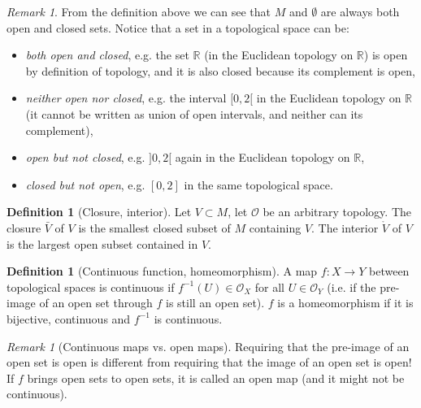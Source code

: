 \documentclass[a4paper,11pt,titlepage, article, oneside]{memoir}
\numberwithin{equation}{section}
\theoremstyle{definition}
\newtheorem{definition}[theorem]{Definition}
\theoremstyle{remark}
\newtheorem{remark}[theorem]{Remark}
\newcommand{\rfield}{\mathbb{R}}
\begin{document}
\begin{remarkbox}\begin{remark}
From the definition above we can see that $M$ and $\emptyset$ are always both open and closed sets. Notice that a set in a topological space can be: \begin{itemize}
\item \textit{both open and closed}, e.g. the set $\rfield$ (in the Euclidean topology on $\rfield$) is open by definition of topology, and it is also closed because its complement is open, 
\item \textit{neither open nor closed}, e.g. the interval $[0, 2[$ in the Euclidean topology on $\rfield$ (it cannot be written as union of open intervals, and neither can its complement),
\item \textit{open but not closed}, e.g. $]0, 2[$ again in the Euclidean topology on $\rfield$,
\item \textit{closed but not open}, e.g. $[0, 2]$ in the same topological space.
\end{itemize}
\end{remark}\end{remarkbox}

\begin{definition}[Closure, interior]
Let $V \subset M$, let $\mathcal{O}$ be an arbitrary topology. The closure $\bar V $ of $V$ is the smallest closed subset of $M$ containing $V$. The interior $\mathring V$ of $V$ is the largest open subset contained in $V$.
\end{definition} %

\begin{definition}[Continuous function, homeomorphism] \label{topcontinuity}
A map $f \colon X \rightarrow Y$ between topological spaces is continuous if $f^{-1}(U) \in \mathcal{O}_X$ for all $U \in \mathcal{O}_Y$ (i.e. if the pre-image of an open set through $f$ is still an open set). $f$ is a homeomorphism if it is bijective, continuous and $f^{-1}$ is continuous.
\end{definition}

\begin{remarkbox}\begin{remark}[Continuous maps vs. open maps]
Requiring that the pre-image of an open set is open is different from requiring that the image of an open set is open! If $f$ brings open sets to open sets, it is called an open map (and it might not be continuous).
\end{remark}\end{remarkbox}
\end{document}
